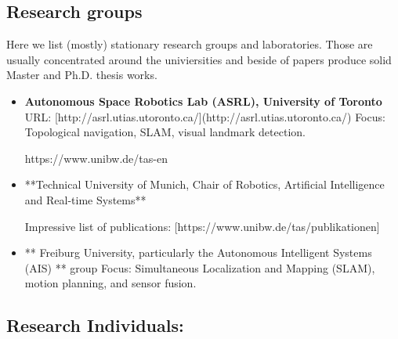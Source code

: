 \documentclass[runningheads]{llncs}
\begin{document}
\subsection{Research groups}

Here we list (mostly) stationary research groups and laboratories. Those are usually concentrated around the univiersities and beside of papers produce solid Master and Ph.D. thesis works.

\begin{itemize}
  \item \textbf{Autonomous Space Robotics Lab (ASRL), University of Toronto} \cite{autonomous_space_robotics_lab_asrl_autonomous_2020}
  URL: [http://asrl.utias.utoronto.ca/](http://asrl.utias.utoronto.ca/)
  Focus: Topological navigation, SLAM, visual landmark detection.

  https://www.unibw.de/tas-en

  \item **Technical University of Munich, Chair of Robotics, Artificial Intelligence and Real-time Systems** \cite{noauthor_chair_2024}



  Impressive list of publications: [https://www.unibw.de/tas/publikationen]

  \item  ** Freiburg University, particularly the Autonomous Intelligent Systems (AIS) ** group
  Focus: Simultaneous Localization and Mapping (SLAM), motion planning, and sensor fusion.

\end{itemize}


\subsection{Research Individuals:}



\end{document}
